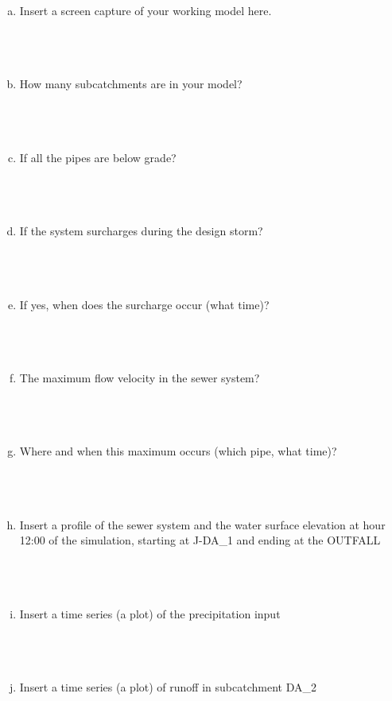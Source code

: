 \documentclass[12pt]{article}
\begin{document}
\begin{enumerate}
\begin{enumerate}[a)]
\item Insert a screen capture of your working model here. \\~\\~\\~\\
\item How many subcatchments are in your model? \\~\\~\\~\\
\item If all the pipes are below grade?  \\~\\~\\~\\
\item If the system surcharges during the design storm?  \\~\\~\\~\\
\item If yes, when does the surcharge occur (what time)? \\~\\~\\~\\
\item The maximum flow velocity in the sewer system?  \\~\\~\\~\\
\item Where and when this maximum occurs (which pipe, what time)?  \\~\\~\\~\\
\item Insert a profile of the sewer system and the water surface elevation at hour 12:00 of the simulation, starting at J-DA\_1 and ending at the OUTFALL \\~\\~\\~\\
\item Insert a time series (a plot) of the precipitation input  \\~\\~\\~\\
\item Insert a time series (a plot) of runoff in subcatchment DA\_2  \\~\\~\\~\\


\end{enumerate}
\end{enumerate}
\end{document}

